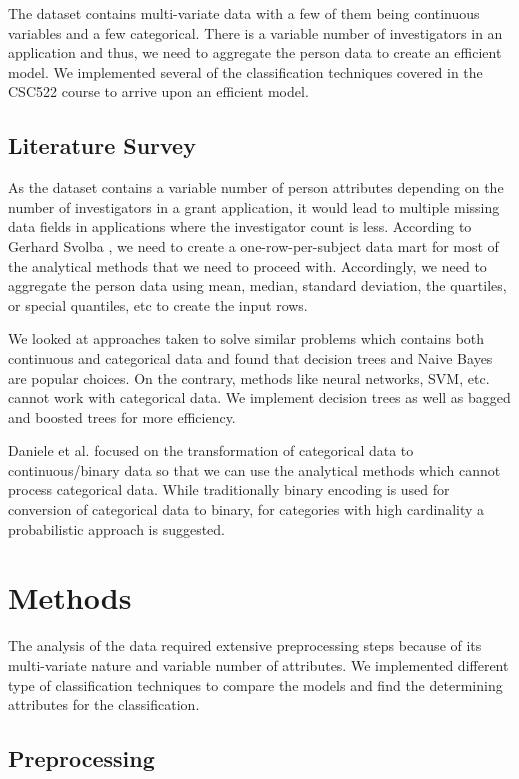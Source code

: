 \documentclass{article} %
\begin{document}
	The dataset contains multi-variate data with a few of them being continuous variables and a few categorical. There is a variable number of investigators in an application and thus, we need to aggregate the person data to create an efficient model. We implemented several of the classification techniques covered in the CSC522 course to arrive upon an efficient model.
	
	
	\subsection{Literature Survey}
	
	As the dataset contains a variable number of person attributes depending on the number of investigators in a grant application, it would lead to multiple missing data fields in applications where the investigator count is less. According to Gerhard Svolba \cite{OneRow}, we need to create a one-row-per-subject data mart for most of the analytical methods that we need to proceed with. Accordingly, we need to aggregate the person data using mean, median, standard deviation, the quartiles, or special quantiles, etc to create the input rows.
	
	We looked at approaches taken to solve similar problems which contains both continuous and categorical data \cite{Matlab} and found that decision trees and Naive Bayes are popular choices. On the contrary, methods like neural networks, SVM, etc. cannot work with categorical data. We implement decision trees as well as bagged and boosted trees for more efficiency. 
	
	Daniele et al. \cite{HighCard} focused on the transformation of categorical data to continuous/binary data so that we can use the analytical methods which cannot process categorical data. While traditionally binary encoding is used for conversion of categorical data to binary, for categories with high cardinality a probabilistic approach is suggested.
	
	\section{Methods}
	
	The analysis of the data required extensive preprocessing steps because of its multi-variate nature and variable number of attributes. We implemented different type of classification techniques to compare the models and find the determining attributes for the classification.
	
	\subsection{Preprocessing}
	
\end{document}
